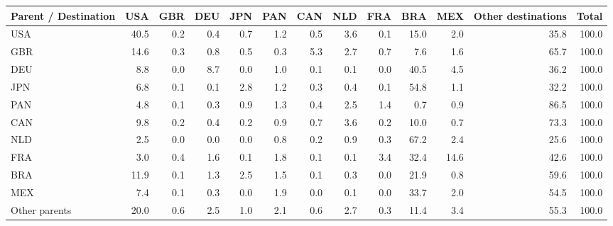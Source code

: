 \begin{tabular}{lrrrrrrrrrrrr}
\toprule
Parent / Destination & USA & GBR & DEU & JPN & PAN & CAN & NLD & FRA & BRA & MEX & Other destinations & Total \\
\midrule
USA & 40.5 & 0.2 & 0.4 & 0.7 & 1.2 & 0.5 & 3.6 & 0.1 & 15.0 & 2.0 & 35.8 & 100.0 \\
GBR & 14.6 & 0.3 & 0.8 & 0.5 & 0.3 & 5.3 & 2.7 & 0.7 & 7.6 & 1.6 & 65.7 & 100.0 \\
DEU & 8.8 & 0.0 & 8.7 & 0.0 & 1.0 & 0.1 & 0.1 & 0.0 & 40.5 & 4.5 & 36.2 & 100.0 \\
JPN & 6.8 & 0.1 & 0.1 & 2.8 & 1.2 & 0.3 & 0.4 & 0.1 & 54.8 & 1.1 & 32.2 & 100.0 \\
PAN & 4.8 & 0.1 & 0.3 & 0.9 & 1.3 & 0.4 & 2.5 & 1.4 & 0.7 & 0.9 & 86.5 & 100.0 \\
CAN & 9.8 & 0.2 & 0.4 & 0.2 & 0.9 & 0.7 & 3.6 & 0.2 & 10.0 & 0.7 & 73.3 & 100.0 \\
NLD & 2.5 & 0.0 & 0.0 & 0.0 & 0.8 & 0.2 & 0.9 & 0.3 & 67.2 & 2.4 & 25.6 & 100.0 \\
FRA & 3.0 & 0.4 & 1.6 & 0.1 & 1.8 & 0.1 & 0.1 & 3.4 & 32.4 & 14.6 & 42.6 & 100.0 \\
BRA & 11.9 & 0.1 & 1.3 & 2.5 & 1.5 & 0.1 & 0.3 & 0.0 & 21.9 & 0.8 & 59.6 & 100.0 \\
MEX & 7.4 & 0.1 & 0.3 & 0.0 & 1.9 & 0.0 & 0.1 & 0.0 & 33.7 & 2.0 & 54.5 & 100.0 \\
Other parents & 20.0 & 0.6 & 2.5 & 1.0 & 2.1 & 0.6 & 2.7 & 0.3 & 11.4 & 3.4 & 55.3 & 100.0 \\
\bottomrule
\end{tabular}
